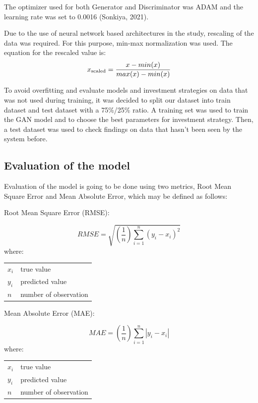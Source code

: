 \documentclass[review]{elsarticle} %
\makeatletter
\newenvironment{conditions}
{\par\vspace{\abovedisplayskip}\noindent\begin{tabular}{>{$}l<{$} @{${}={}$} l}}
       {\end{tabular}\par\vspace{\belowdisplayskip}}
\makeatother
\begin{document}
The optimizer used for both Generator and Discriminator was ADAM and the learning rate was set to 0.0016 (Sonkiya, 2021).

Due to the use of neural network based architectures in the study, rescaling of the data was required. For this purpose, min-max normalization was used. The equation for the rescaled value is: 
\begin{equation} x\textsubscript{scaled} = \frac{x - min(x)}{max(x) - min(x)} \end{equation}

To avoid overfitting and evaluate models and investment strategies on data that was not used during training, it was decided to split our dataset into train dataset and test dataset with a 75\%/25\% ratio. A training set was used to train the GAN model and to choose the best parameters for investment strategy. Then, a test dataset was used to check findings on data that hasn't been seen by the system before.

\subsection{Evaluation of the model}

Evaluation of the model is going to be done using two metrics, Root Mean Square Error and Mean Absolute Error, which may be defined as follows:  \\ 

\begin{center}   Root Mean Square Error (RMSE):  \end{center}
\begin{equation}  RMSE = \sqrt{(\frac{1}{n})\sum_{i=1}^{n}(y_{i} - x_{i})^{2}} \end{equation}
where:
\begin{conditions}
 x_i     &  true value \\
 y_i     &  predicted value \\   
 n &  number of observation
\end{conditions}

\begin{center}  Mean Absolute Error (MAE): \end{center}
\begin{equation} MAE =(\frac{1}{n})\sum_{i=1}^{n}\left | y_{i} - x_{i} \right | \end{equation}
where:
\begin{conditions}
 x_i     &  true value \\
 y_i     &  predicted value \\   
 n &  number of observation
\end{conditions}
\end{document}
